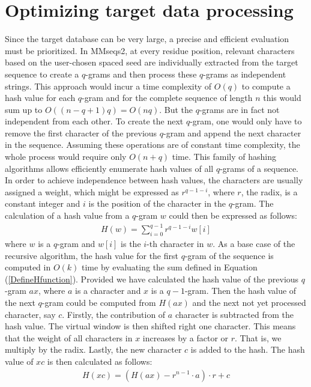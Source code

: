 \documentclass[twoside,a4paper,bsc]{master}
\newcommand{\Qgram}[1]{\(#1\)-gram}
\begin{document}
\section{Optimizing target data processing}
Since the target database can be very large, a precise and efficient
evaluation must be prioritized. In MMseqs2, at every residue position,
relevant characters based on the user-chosen spaced seed are individually
extracted from the target sequence to create a \Qgram{q}s and then process
these \Qgram{q}s as independent strings. This approach would incur a time
complexity of \(O(q)\) to compute a hash value for each \Qgram{q} and for
the complete sequence of length \(n\) this would sum up to
$O((n-q+1)q)=O(nq)$.
But the \Qgram{q}s are in fact not independent from each other. To create
the next \Qgram{q}, one would only have to remove the first character of
the previous \Qgram{q} and append the next character in the sequence.
Assuming these operations are of constant time complexity, the whole
process would require only $O(n+q)$ time.
This family of hashing algorithms allows efficiently enumerate hash values
of all \Qgram{q}s of a sequence. In order to achieve independence between
hash values, the characters are usually assigned a weight, which might be
expressed as $r^{q-1-i}$, where $r$, the radix, is a constant integer and
$i$ is the position of the character in the \Qgram{q}. The calculation of a
hash value from a \Qgram{q} \(w\) could then be expressed as follows:
\begin{align}
H(w) = \sum_{i=0}^{q-1}r^{q-1-i}w[i]\label{DefineHfunction}
\end{align}
where $w$ is a \Qgram{q} and \(w[i]\) is the \(i\)-th character in \(w\).
As a base case of the recursive algorithm, the hash value for the
first \Qgram{q} of the sequence is computed in \(O(k)\) time by evaluating
the sum defined in Equation (\ref{DefineHfunction}).
Provided we have calculated the hash value of the previous \Qgram{q}
\(ax\), where \(a\) is a character and \(x\) is a \Qgram{q-1}.
Then the hash value
of the next \Qgram{q} could be computed from \(H(ax)\) and the next not yet
processed character, say \(c\). Firstly, the contribution of \(a\)
character is subtracted from the hash value. The virtual window is then
shifted right one character. This means that the weight of all characters
in \(x\) increases by a factor or \(r\). That is, we multiply by the radix.
Lastly, the new character \(c\) is added to the hash.
The hash value of \(xc\) is then calculated as follows:
\begin{align}
H(xc) = (H(ax)-r^{n-1}\cdot a)\cdot r+c\label{IncrementallyComputeH}
\end{align}
\end{document}
